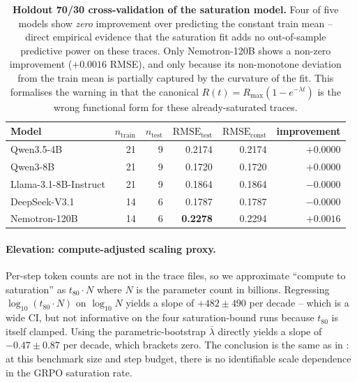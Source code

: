 \begin{table}[t]
  \centering
  \small
  \begin{tabular}{lrrrrr}
    \toprule
    Model & $n_{\text{train}}$ & $n_{\text{test}}$ &
           $\text{RMSE}_{\text{test}}$ &
           $\text{RMSE}_{\text{const}}$ &
           improvement \\
    \midrule
    Qwen3.5-4B            & 21 & 9 & 0.2174 & 0.2174 & $+0.0000$ \\
    Qwen3-8B              & 21 & 9 & 0.1720 & 0.1720 & $+0.0000$ \\
    Llama-3.1-8B-Instruct & 21 & 9 & 0.1864 & 0.1864 & $-0.0000$ \\
    DeepSeek-V3.1         & 14 & 6 & 0.1787 & 0.1787 & $-0.0000$ \\
    Nemotron-120B         & 14 & 6 & \textbf{0.2278} & 0.2294 & $+0.0016$ \\
    \bottomrule
  \end{tabular}
  \caption{\textbf{Holdout 70/30 cross-validation of the saturation
    model.}  Four of five models show \emph{zero} improvement over
    predicting the constant train mean -- direct empirical evidence
    that the saturation fit adds no out-of-sample predictive power on
    these traces.  Only Nemotron-120B shows a non-zero improvement
    ($+0.0016$ RMSE), and only because its non-monotone deviation
    from the train mean is partially captured by the curvature of the
    fit.  This formalises the warning in
     that the canonical
    $R(t) = R_{\max}(1 - e^{-\lambda t})$ is the wrong functional form
    for these already-saturated traces.}
  \label{tab:scaling-holdout}
\end{table}

\paragraph{Elevation: compute-adjusted scaling proxy.}
\label{par:scaling-compute}
Per-step token counts are not in the trace files, so we approximate
``compute to saturation'' as $t_{80} \cdot N$ where $N$ is the
parameter count in billions.  Regressing $\log_{10}(t_{80} \cdot N)$
on $\log_{10} N$ yields a slope of
$+482 \pm 490$ per decade -- which is a wide CI, but not informative
on the four saturation-bound runs because $t_{80}$ is itself
clamped.  Using the parametric-bootstrap $\bar\lambda$ directly
yields a slope of $-0.47 \pm 0.87$ per decade, which brackets zero.
The conclusion is the same as in
: at this benchmark size and step
budget, there is no identifiable scale dependence in the GRPO
saturation rate.

